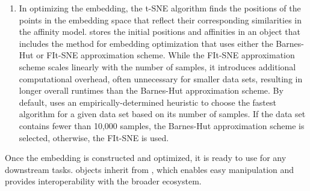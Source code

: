 \documentclass[article]{jss}
\newcommand{\opentsne}{\pkg{openTSNE}\xspace}
\begin{document}
\begin{enumerate}
\item In optimizing the embedding, the t-SNE algorithm finds the positions of the points in the embedding space that reflect their corresponding similarities in the affinity model. \opentsne stores the initial positions and affinities in an  object that includes the  method for embedding optimization that uses either the Barnes-Hut or FIt-SNE approximation scheme. While the FIt-SNE approximation scheme scales linearly with the number of samples, it introduces additional computational overhead, often unnecessary for smaller data sets, resulting in longer overall runtimes than the Barnes-Hut approximation scheme. By default, \opentsne uses an empirically-determined heuristic to choose the fastest algorithm for a given data set based on its number of samples. If the data set contains fewer than 10,000 samples, the Barnes-Hut approximation scheme is selected, otherwise, the FIt-SNE is used.

\end{enumerate}

Once the embedding is constructed and optimized, it is ready to use for any downstream tasks.  objects inherit from , which enables easy manipulation and provides interoperability with the broader  ecosystem.
\end{document}
